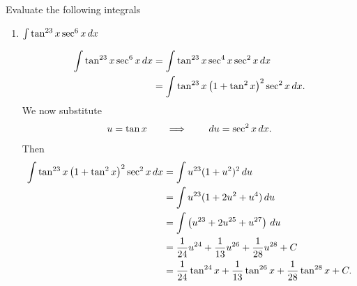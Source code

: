 \documentclass[handout]{ximera}
\begin{document}
\begin{problem}
Evaluate the following integrals
	\begin{enumerate}
	
	\item  $\int \tan^{23} x \sec^6 x \,d x$
	\begin{freeResponse}
		\begin{align*}
		\int \tan^{23} x \sec^6 x \,d x 
		&= \int \tan^{23} x \sec^4 x \sec^2 x \,d x  \\
		&= \int \tan^{23} x \left( 1 + \tan^2 x \right)^2 \sec^2 x \,d x .
		\end{align*}
	We now substitute
		{\color{red}
		\[
		u = \tan x 	\qquad	\Longrightarrow		\qquad	\,d u = \sec^2 x \,d x.
		\]
		}
	Then
		\begin{align*}
		\int \tan^{23} x \left( 1 + \tan^2 x \right)^2 \sec^2 x \,d x
		&= \int u^{23} (1+u^2)^2 \,d u  \\
		&= \int u^{23} (1 + 2u^2 + u^4) \,d u  \\
		&= \int \left( u^{23} + 2u^{25} + u^{27} \right) \,d u  \\
		&= \frac{1}{24} u^{24} + \frac{1}{13} u^{26} + \frac{1}{28} u^{28} + C  \\
		&= \frac{1}{24} \tan^{24} x + \frac{1}{13} \tan^{26} x + \frac{1}{28} \tan^{28} x + C.
		\end{align*}
	\end{freeResponse}
	
	
	

\end{enumerate}
\end{problem}
\end{document}
